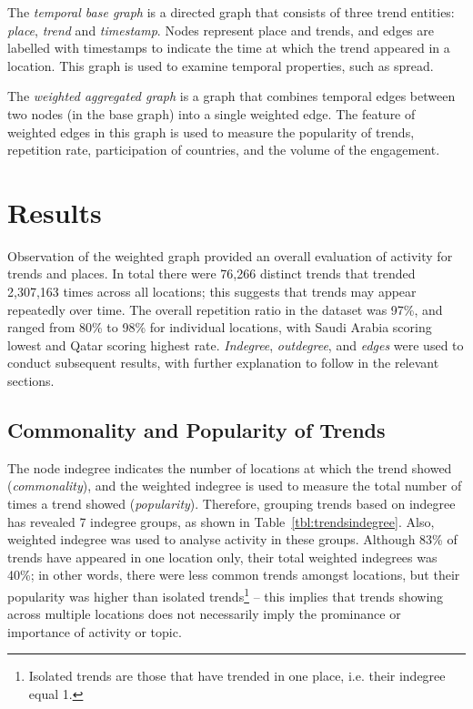 \documentclass{llncs}
\begin{document}
The {\emph{temporal base graph}} is a directed graph that consists of
three trend entities: {\emph{place}}, {\emph{trend}} and
{\emph{timestamp}}. Nodes represent place and trends, and edges are
labelled with timestamps to indicate the time at which the trend
appeared in a location. This graph is used to examine temporal
properties, such as spread.

The {\emph{weighted aggregated graph}} is a graph that combines
temporal edges between two nodes (in the base graph) into a single
weighted edge. The feature of weighted edges in this graph is used to
measure the popularity of trends, repetition rate, participation of
countries, and the volume of the engagement.


\section{Results}\label{results}

Observation of the weighted graph provided an overall evaluation of
activity for trends and places. In total there were 76,266 distinct
trends that trended 2,307,163 times across all locations; this
suggests that trends may appear repeatedly over time. The overall
repetition ratio in the dataset was 97\%, and ranged from 80\% to 98\%
for individual locations, with Saudi Arabia scoring lowest and Qatar
scoring highest rate. {\emph{Indegree}}, {\emph{outdegree}}, and
{\emph{edges}} were used to conduct subsequent results, with further
explanation to follow in the relevant sections.

\subsection{Commonality and Popularity of Trends}

The node indegree indicates the number of locations at which the trend
showed ({\emph{commonality}}), and the weighted indegree is used to
measure the total number of times a trend showed
({\emph{popularity}}). Therefore, grouping trends based on indegree has
revealed 7 indegree groups, as shown in Table~\ref{tbl:trendsindegree}. 
Also, weighted indegree was used to analyse activity in these groups. 
Although 83\% of trends have appeared in one location only, their total 
weighted indegrees was 40\%; in other words, there were less common 
trends amongst locations, but their popularity was higher than isolated
trends\footnote{Isolated trends are those that have trended in one
place, i.e. their indegree equal 1.} -- this implies that trends
showing across multiple locations does not necessarily imply the prominance or
importance of activity or topic.
\end{document}
